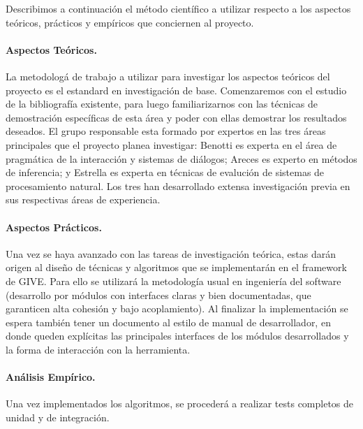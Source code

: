 
Describimos a continuaci\'on el m\'etodo cient\'ifico a utilizar
respecto a los aspectos te\'oricos, pr\'acticos y emp\'iricos
que conciernen al proyecto.

\paragraph{Aspectos Te\'oricos.}
La metodolog\'a de trabajo a utilizar para investigar los aspectos
te\'oricos del proyecto es el estandard en investigaci\'on de base.
Comenzaremos con el estudio de la bibliograf\'ia existente, para luego
familiarizarnos con las t\'ecnicas de demostraci\'on espec\'ificas de esta
\'area y poder con ellas demostrar los resultados deseados. El grupo
responsable esta formado por expertos en las tres \'areas principales
que el proyecto planea investigar: Benotti es experta en el \'area de
pragm\'atica de la interacci\'on y sistemas de di\'alogos; Areces es
experto en m\'etodos de inferencia; y Estrella es experta en t\'ecnicas
de evaluci\'on de sistemas de procesamiento natural.
Los tres han desarrollado extensa investigaci\'on previa en sus respectivas
\'areas
de experiencia.

\paragraph{Aspectos Pr\'acticos.}
Una vez se haya avanzado con las tareas de investigaci\'on te\'orica,
estas dar\'an origen al dise\~no de t\'ecnicas y algoritmos que se
implementar\'an en el framework de GIVE. Para ello se utilizar\'a la
metodolog\'ia
usual en ingenier\'ia del software (desarrollo por
m\'odulos con interfaces claras y bien documentadas,
que garanticen alta cohesi\'on y bajo acoplamiento).
Al finalizar la implementaci\'on
se espera tambi\'en tener un documento al estilo de manual de
desarrollador, en donde queden expl\'icitas las principales interfaces
de los m\'odulos desarrollados y la forma de interacci\'on con la
herramienta.


\paragraph{An\'alisis Emp\'irico.}
Una vez
implementados los algoritmos, se proceder\'a a realizar tests
completos de unidad y de integraci\'on.


